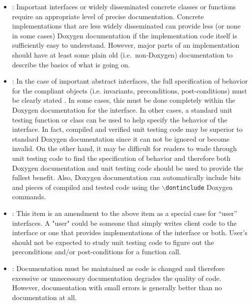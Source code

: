 \begin{itemize}

{}\item\DOXPVariableLevelOfDetail: Important interfaces or widely disseminated
concrete classes or functions require an appropriate level of precise
documentation.  Concrete implementations that are less widely disseminated can
provide less (or none in some cases) Doxygen documentation if the
implementation code itself is sufficiently easy to understand.  However, major
parts of an implementation should have at least some plain old (i.e.\
non-Doxygen) documentation to describe the basics of what is going on.

{}\item\DOXPFullyDocumentInterfaces: In the case of important abstract
interfaces, the full specification of behavior for the compliant objects
(i.e. invariants, preconditions, post-conditions) must be clearly stated
{}\cite[Item 69]{C++CodingStandards05}.  In some cases, this must be done
completely within the Doxygen documentation for the interface.  In other
cases, a standard unit testing function or class can be used to help specify
the behavior of the interface.  In fact, compiled and verified unit testing
code may be superior to standard Doxygen documentation since it can not be
ignored or become invalid.  On the other hand, it may be difficult for readers
to wade through unit testing code to find the specification of behavior and
therefore both Doxygen documentation and unit testing code should be used to
provide the fullest benefit.  Also, Doxygen documentation can automatically
include bits and pieces of compiled and tested code using the
{}\texttt{$\backslash$dontinclude} Doxygen commands.

{}\item\DOXPFullyDocumentUserIntefaces: This item is an amendment to the above
item as a special case for ``user'' interfaces.  A "user" could be someone
that simply writes client code to the interface or one that provides
implementations of the interface or both.  User's should not be expected to
study unit testing code to figure out the preconditions and/or post-conditions
for a function call.

{}\item\DOXPWrongDocumentationBad: Documentation must be maintained as code is
changed and therefore excessive or unnecessary documentation degrades the
quality of code.  However, documentation with small errors is generally better
than no documentation at all.


\end{itemize}
